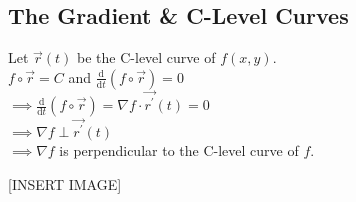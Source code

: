 \subsection{The Gradient \& C-Level Curves}
\noindent
Let $\vec{r}(t)$ be the C-level curve of $f(x,y)$.\\
\indent
$f\circ\vec{r}=C$ and $\frac{\mathrm{d}}{\mathrm{d}t}(f\circ\vec{r})=0$\\
\indent
$\implies\frac{\mathrm{d}}{\mathrm{d}t}(f\circ\vec{r})=\nabla f\cdot\vec{r^\prime}(t)=0$\\
\indent
$\implies \nabla f\perp\vec{r^\prime}(t)$\\
\indent
$\implies\nabla f$ is perpendicular to the C-level curve of $f$.

[INSERT IMAGE]